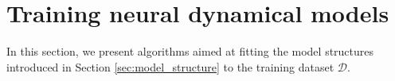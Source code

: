 \documentclass{article} %
\newcommand{\NN}{\mathcal{N}} %
\newcommand{\Did}{{\mathcal{D}}}
\newcommand{\ymodel}{y^{\rm o}}
\begin{document}


\section{Training neural dynamical models}
\label{sec:training}

In this section, we present algorithms aimed at fitting the model structures  introduced in Section \ref{sec:model_structure} to the training dataset $\Did$. 
\end{document}
